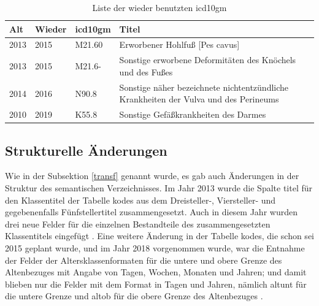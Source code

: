 \begin{table}[ht]
	\centering
	\small
	\caption[Wieder benutzte \acs{icd10gm}]{Liste der wieder benutzten \ac{icd10gm}}
	\label{tab:wieder}
	\begin{tabular}{|l|l|l|p{6cm}|}
		\hline
		\rowcolor{lightgray} Alt & Wieder & \ac{icd10gm} & Titel \\ \hline
		2013 & 2015 & M21.60 & Erworbener Hohlfuß [Pes cavus] \\ \hline
		2013 & 2015 & M21.6- & Sonstige erworbene Deformitäten des Knöchels und des Fußes \\ \hline
		2014 & 2016 & N90.8 & Sonstige näher bezeichnete nichtentzündliche Krankheiten der Vulva und des Perineums \\ \hline
		2010 & 2019 & K55.8 & Sonstige Gefäßkrankheiten des Darmes \\ \hline

\end{tabular}
\end{table}

\subsection{Strukturelle Änderungen}

Wie in der Subsektion \ref{transf} genannt wurde, es gab auch Änderungen in der Struktur des semantischen Verzeichnisses. Im Jahr 2013 wurde die Spalte \textsf{titel} für den Klassentitel der Tabelle \textsf{kodes} aus dem Dreisteller-, Viersteller- und gegebenenfalls Fünfstellertitel zusammengesetzt. Auch in diesem Jahr wurden drei neue Felder für die einzelnen Bestandteile des zusammengesetzten Klassentitels eingefügt \cite{readme13}. Eine weitere Änderung in der Tabelle \textsf{kodes}, die schon sei 2015 geplant wurde, und im Jahr 2018 vorgenommen wurde, war die Entnahme der Felder der Altersklassenformaten für die untere und obere Grenze des Altenbezuges mit Angabe von Tagen, Wochen, Monaten und Jahren; und damit blieben nur die Felder mit dem Format in Tagen und Jahren, nämlich  \textsf{altunt} für die untere Grenze und \textsf{altob} für die obere Grenze des Altenbezuges \cite{readme17}.